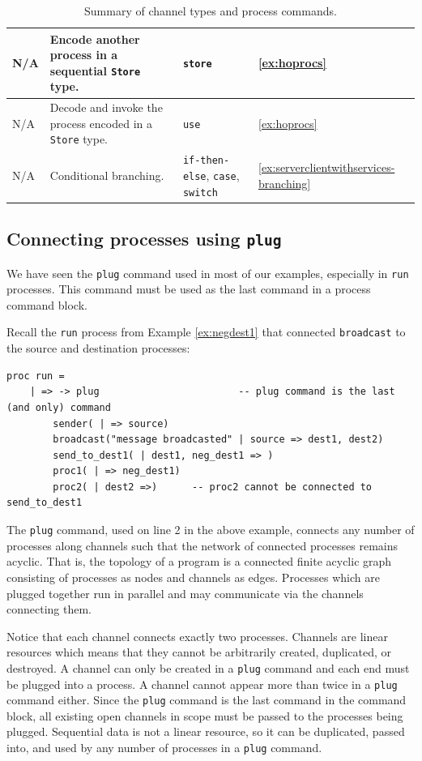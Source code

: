 \documentclass[11pt]{article}
\begin{document}
\begin{table}[!ht]
\begin{center}
\begin{tabular}{ |m{3.3cm} | m{6.75cm} | m{2.4cm} | m{1.4cm} | }
		 \hline
		  N/A & Encode another process in a sequential \lstinline$Store$ type. & \lstinline$store$ & \ref{ex:hoprocs} \\
		 \hline
		  N/A & Decode and invoke the process \newline encoded in a \lstinline$Store$ type. & \lstinline$use$ & \ref{ex:hoprocs} \\
		 \hline
		  N/A & Conditional branching. & \lstinline$if-then-else$, \lstinline$case$, \lstinline$switch$ & \ref{ex:serverclientwithservices-branching}\\
		 \hline
	\end{tabular}
	\caption{Summary of channel types and process commands.}
	\label{Table:summary}
\end{center}
\end{table}

\subsection{Connecting processes using {\tt plug}}

We have seen the \lstinline$plug$ command used in most of our examples, especially in \lstinline$run$ processes.
This command must be used as the last command in a process command block.

Recall the \lstinline$run$ process from Example \ref{ex:negdest1} that connected \lstinline$broadcast$ to the source and destination processes:
\begin{lstlisting}
proc run =
	| => -> plug						-- plug command is the last (and only) command
		sender( | => source)
		broadcast("message broadcasted" | source => dest1, dest2)
		send_to_dest1( | dest1, neg_dest1 => )
		proc1( | => neg_dest1)				
		proc2( | dest2 =>)		-- proc2 cannot be connected to send_to_dest1
\end{lstlisting}	
The \lstinline$plug$ command, used on line 2 in the above example, connects any number of processes along channels such that the network of connected processes remains acyclic.
That is, the topology of a program is a connected finite acyclic graph consisting of processes as nodes and channels as edges.
Processes which are plugged together run in parallel and may communicate via the channels connecting them. 

Notice that each channel connects exactly two processes.
Channels are linear resources which means that they cannot be arbitrarily created, duplicated, or destroyed.
A channel can only be created in a \lstinline$plug$ command and each end must be plugged into a process.
A channel cannot appear more than twice in a \lstinline$plug$ command either.
Since the \lstinline$plug$ command is the last command in the command block, all existing open channels in scope must be passed to the processes being plugged.
Sequential data is not a linear resource, so it can be duplicated, passed into, and used by any number of processes in a \lstinline$plug$ command.
\end{document}
